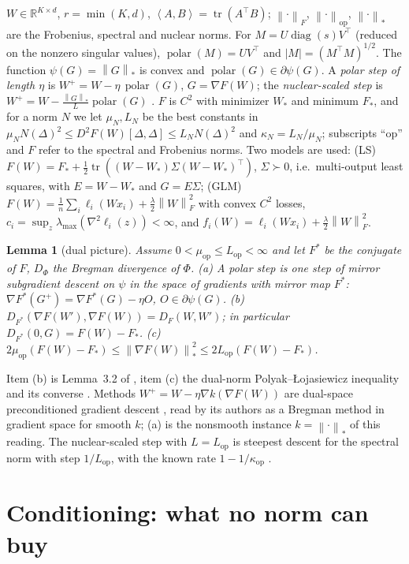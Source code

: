\documentclass[11pt]{article}
\newtheorem{lemma}[theorem]{Lemma}
\newcommand{\R}{\mathbb{R}}
\newcommand{\nop}[1]{\left\|#1\right\|_{\mathrm{op}}}
\newcommand{\nnuc}[1]{\left\|#1\right\|_{*}}
\newcommand{\nF}[1]{\left\|#1\right\|_{F}}
\newcommand{\inner}[2]{\left\langle #1, #2 \right\rangle}
\newcommand{\abs}[1]{\left|#1\right|}
\newcommand{\tr}{\operatorname{tr}}
\newcommand{\diag}{\operatorname{diag}}
\newcommand{\polar}{\operatorname{polar}}
\newcommand{\Lop}{L_{\mathrm{op}}}
\newcommand{\muop}{\mu_{\mathrm{op}}}
\newcommand{\kop}{\kappa_{\mathrm{op}}}
\newcommand{\lmax}{\lambda_{\max}}
\begin{document}
$W\in\R^{K\times d}$, $r=\min(K,d)$, $\inner AB=\tr(A^\top B)$; $\nF\cdot$, $\nop\cdot$, $\nnuc\cdot$ are the
Frobenius, spectral and nuclear norms. For $M=U\diag(s)V^\top$ (reduced on the nonzero singular values),
$\polar(M)=UV^\top$ and $\abs M=(M^\top M)^{1/2}$. The function $\psi(G)=\nnuc G$ is convex and
$\polar(G)\in\partial\psi(G)$. A \emph{polar step of length $\eta$} is $W^+=W-\eta\,\polar(G)$, $G=\nabla F(W)$; the
\emph{nuclear-scaled step} is $W^+=W-\frac{\nnuc G}{L}\polar(G)$ \cite{carlson2015stochastic,lau2025polargrad}. $F$ is
$C^2$ with minimizer $W_\ast$ and minimum $F_\ast$, and for a norm $N$ we let $\mu_N,L_N$ be the best constants in
$\mu_NN(\Delta)^2\le D^2F(W)[\Delta,\Delta]\le L_NN(\Delta)^2$ and $\kappa_N=L_N/\mu_N$; subscripts ``op'' and $F$
refer to the spectral and Frobenius norms. Two models are used: (LS)
$F(W)=F_\ast+\frac12\tr((W-W_\ast)\Sigma(W-W_\ast)^\top)$, $\Sigma\succ0$, i.e.\ multi-output least squares, with
$E=W-W_\ast$ and $G=E\Sigma$; (GLM) $F(W)=\frac1n\sum_i\ell_i(Wx_i)+\frac\lambda2\nF W^2$ with convex $C^2$ losses,
$c_i=\sup_z\lmax(\nabla^2\ell_i(z))<\infty$, and $f_i(W)=\ell_i(Wx_i)+\frac\lambda2\nF W^2$.

\begin{lemma}[dual picture]\label{lem:dual}
Assume $0<\muop\le\Lop<\infty$ and let $F^\ast$ be the conjugate of $F$, $D_\Phi$ the Bregman divergence of $\Phi$.
(a) A polar step is one step of mirror subgradient descent on $\psi$ in the space of gradients with mirror map
$F^\ast$: $\nabla F^\ast(G^+)=\nabla F^\ast(G)-\eta O$, $O\in\partial\psi(G)$.
(b) $D_{F^\ast}(\nabla F(W'),\nabla F(W))=D_F(W,W')$; in particular $D_{F^\ast}(0,G)=F(W)-F_\ast$.
(c) $2\muop(F(W)-F_\ast)\le\nnuc{\nabla F(W)}^2\le2\Lop(F(W)-F_\ast)$.
\end{lemma}
Item (b) is Lemma~3.2 of \cite{maddison2021dual}, item (c) the dual-norm Polyak--\L{}ojasiewicz inequality and its
converse \cite{balles2020geometry,leplat2025norm}. Methods $W^+=W-\eta\nabla k(\nabla F(W))$ are dual-space
preconditioned gradient descent \cite{maddison2021dual}, read by its authors as a Bregman method in gradient space
for smooth $k$; (a) is the nonsmooth instance $k=\nnuc\cdot$ of this reading. The nuclear-scaled step with $L=\Lop$
is steepest descent for the spectral norm with step $1/\Lop$, with the known rate $1-1/\kop$
\cite{balles2020geometry}.

\section{Conditioning: what no norm can buy}\label{sec:kappa}
\end{document}
